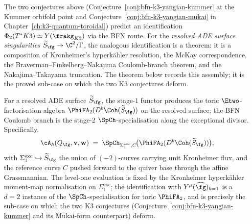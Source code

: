 The two conjectures above (Conjecture~\ref{conj:bfn-k3-yangian-kummer} at the Kummer orbifold point and Conjecture~\ref{conj:bfn-k3-yangian-mukai} in Chapter~\ref{ch:k3-quantum-toroidal}) predict an identification $\Phi_2(T^*K3) \simeq Y(\frakg_{K3})$ via the BFN route. For the \emph{resolved ADE surface singularities} $\widetilde{S}_\fg \to \C^2/\Gamma$, the analogous identification is a theorem: it is a composition of Kronheimer's hyperk\"ahler resolution, the McKay correspondence, the Braverman--Finkelberg--Nakajima Coulomb-branch theorem, and the Nakajima--Takayama truncation. The theorem below records this assembly; it is the proved sub-case on which the two K3 conjectures deform.

\begin{remark}
\label{rem:k3y-stage-bfn-ade}
For a resolved ADE surface $\widetilde{S}_\fg$, the stage-$1$
functor produces the toric $\Etwo$-factorisation algebra
$\PhiFA_2(D^b\Coh(\widetilde{S}_\fg))$ on the resolved surface; the
BFN Coulomb branch is the stage-$2$ $\SpCh$-specialisation along
the exceptional divisor. Specifically,
\[
 \cA_\hbar(Q_\fg, \mathbf{v}, \mathbf{w})
 \;=\;
 \SpCh_{\Sigma_1^{\mathrm{exc}}, C}\!\bigl(
 \PhiFA_2(D^b\Coh(\widetilde{S}_\fg))\bigr),
\]
with $\Sigma_1^{\mathrm{exc}} \hookrightarrow \widetilde{S}_\fg$
the union of $(-2)$-curves carrying unit Kronheimer flux, and the
reference curve $C$ pushed forward to the quiver base through the
affine Grassmannian. The level-one evaluation is fixed by the
Kronheimer hyperk\"ahler moment-map normalisation on
$\Sigma_1^{\mathrm{exc}}$; the identification with
$Y^\mu(\widehat{\fg})_{k=1}$ is a $d = 2$ instance of the
$\SpCh$-specialisation for toric $\PhiFA_2$, and is precisely the
sub-case on which the two K3 conjectures
(Conjecture~\ref{conj:bfn-k3-yangian-kummer} and its Mukai-form
counterpart) deform.
\end{remark}

